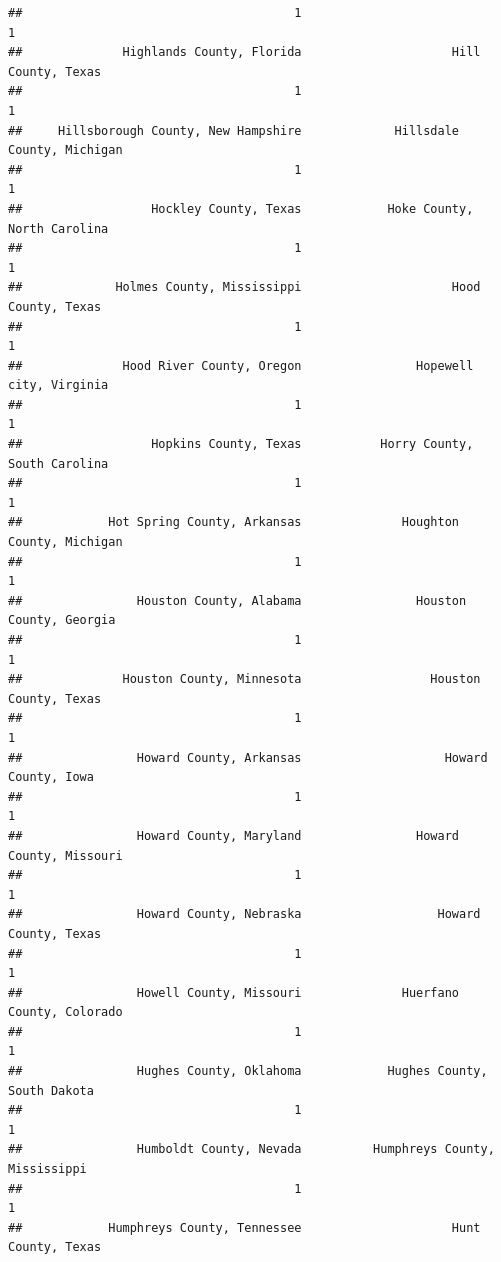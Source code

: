 \documentclass[
]{article}
\begin{document}
\begin{verbatim}
##                                      1                                      1 
##              Highlands County, Florida                     Hill County, Texas 
##                                      1                                      1 
##     Hillsborough County, New Hampshire             Hillsdale County, Michigan 
##                                      1                                      1 
##                  Hockley County, Texas            Hoke County, North Carolina 
##                                      1                                      1 
##             Holmes County, Mississippi                     Hood County, Texas 
##                                      1                                      1 
##              Hood River County, Oregon                Hopewell city, Virginia 
##                                      1                                      1 
##                  Hopkins County, Texas           Horry County, South Carolina 
##                                      1                                      1 
##            Hot Spring County, Arkansas              Houghton County, Michigan 
##                                      1                                      1 
##                Houston County, Alabama                Houston County, Georgia 
##                                      1                                      1 
##              Houston County, Minnesota                  Houston County, Texas 
##                                      1                                      1 
##                Howard County, Arkansas                    Howard County, Iowa 
##                                      1                                      1 
##                Howard County, Maryland                Howard County, Missouri 
##                                      1                                      1 
##                Howard County, Nebraska                   Howard County, Texas 
##                                      1                                      1 
##                Howell County, Missouri              Huerfano County, Colorado 
##                                      1                                      1 
##                Hughes County, Oklahoma            Hughes County, South Dakota 
##                                      1                                      1 
##                Humboldt County, Nevada          Humphreys County, Mississippi 
##                                      1                                      1 
##            Humphreys County, Tennessee                     Hunt County, Texas 

\end{verbatim}
\end{document}

